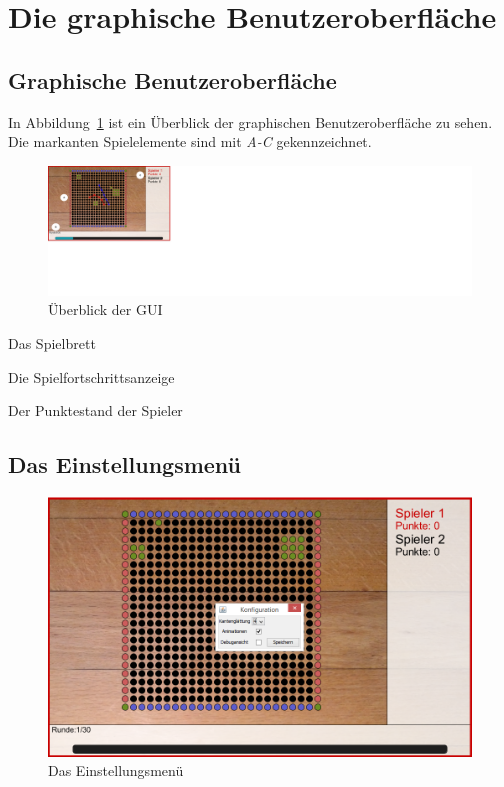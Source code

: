 \documentclass[a4paper, ngerman]{scrartcl}
\begin{document}
\section{Die graphische Benutzeroberfläche}

\subsection{Graphische Benutzeroberfläche}

	 
	In Abbildung~\ref{fig:GUI} ist ein Überblick der graphischen Benutzeroberfläche
	zu sehen. Die markanten Spielelemente sind mit \emph{A-C} gekennzeichnet.
	\begin{figure}[H]
		\centering		
		\includegraphics[scale = 0.6]{bilder/uebersicht.png} 
		\caption{Überblick der GUI}
		\label{fig:GUI}
	\end{figure}
	 
\begin{compactenum}[A)] 
\item Das Spielbrett
\item Die Spielfortschrittsanzeige  
\item Der Punktestand der Spieler
	\end{compactenum}
	
\subsection{Das Einstellungsmenü} 
	 \begin{figure}[H]
		\centering
		\includegraphics[scale=0.6]{bilder/konfiguration.png}
		\caption{Das Einstellungsmenü}
		\label{fig:Configuration}
	\end{figure}
	
\end{document}
